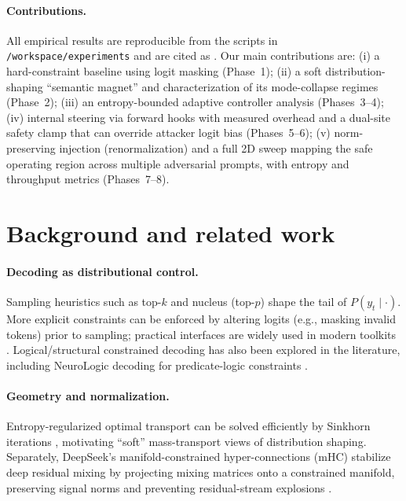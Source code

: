 \documentclass{article}
\begin{document}
\paragraph{Contributions.}
All empirical results are reproducible from the scripts in \texttt{/workspace/experiments} and are cited as \citep{thiswork2026}.
Our main contributions are:
(i) a hard-constraint baseline using logit masking (Phase~1);
(ii) a soft distribution-shaping ``semantic magnet'' and characterization of its mode-collapse regimes (Phase~2);
(iii) an entropy-bounded adaptive controller analysis (Phases~3--4);
(iv) internal steering via forward hooks with measured overhead and a dual-site safety clamp that can override attacker logit bias (Phases~5--6);
(v) norm-preserving injection (renormalization) and a full 2D sweep mapping the safe operating region across multiple adversarial prompts, with entropy and throughput metrics (Phases~7--8).

\section{Background and related work}

\paragraph{Decoding as distributional control.}
Sampling heuristics such as top-$k$ \citep{fan2018topk} and nucleus (top-$p$) \citep{holtzman2020nucleus} shape the tail of $P(y_t\mid\cdot)$.
More explicit constraints can be enforced by altering logits (e.g., masking invalid tokens) prior to sampling; practical interfaces are widely used in modern toolkits \citep{wolf2020transformers}.
Logical/structural constrained decoding has also been explored in the literature, including NeuroLogic decoding for predicate-logic constraints \citep{lu2021neurologic}.

\paragraph{Geometry and normalization.}
Entropy-regularized optimal transport can be solved efficiently by Sinkhorn iterations \citep{cuturi2013sinkhorn}, motivating ``soft'' mass-transport views of distribution shaping.
Separately, DeepSeek's manifold-constrained hyper-connections (mHC) stabilize deep residual mixing by projecting mixing matrices onto a constrained manifold, preserving signal norms and preventing residual-stream explosions \citep{deepseekmhc2025}.
\end{document}
